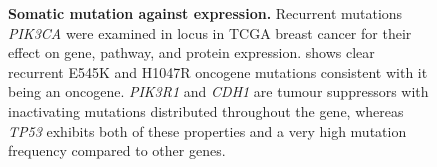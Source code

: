 \begin{figure}[!ht]
\begin{mdframed}
\begin{center}
        
    \end{center}
    \caption[Somatic mutation against expression]{\small \textbf{Somatic mutation against expression.} Recurrent mutations \textit{PIK3CA} were examined in locus in TCGA breast cancer for their effect on gene, pathway, and protein expression. shows clear recurrent E545K and H1047R oncogene mutations consistent with it being an oncogene. \textit{PIK3R1} and \textit{CDH1} are tumour suppressors with inactivating mutations distributed throughout the gene, whereas \textit{TP53} exhibits both of these properties and a very high mutation frequency compared to other genes.
}
\label{fig:mutation_expr}
\end{mdframed}
\end{figure}


